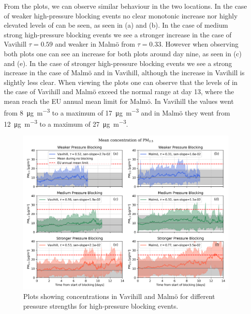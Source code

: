 From the plots, we can observe similar behaviour in the two locations. In the case of weaker high-pressure blocking events no clear monotonic increase nor highly elevated levels of \PM can be seen, as seen in (a) and (b). In the case of medium strong high-pressure blocking events we see a stronger increase in the case of Vavihill $\tau=0.59$ and weaker in Malmö from $\tau=0.33$. However when observing both plots one can see an increase for both plots around day nine, as seen in (c) and (e). In the case of stronger high-pressure blocking events we see a strong increase in the case of Malmö and in Vavihill, although the increase in Vavihill is slightly less clear. When viewing the plots one can observe that the levels of \PM in the case of Vavihill and Malmö exceed the normal range at day 13, where the mean reach the EU annual mean limit for Malmö. In Vavihill the values went from \SI{8}{\micro\gram\per\meter\cubed} to a maximum of \SI{17}{\micro\gram\per\meter\cubed} and in Malmö they went from \SI{12}{\micro\gram\per\meter\cubed} to a maximum of \SI{27}{\micro\gram\per\meter\cubed}. 

\begin{figure}[H]
    \centering
    \includegraphics[width=\textwidth]{Figures/Meanplot_pressure.png}
    \caption{Plots showing \PM concentrations in Vavihill and Malmö for different pressure strengths for high-pressure blocking events.}
    \label{fig:Meanplot_pressure}
\end{figure}

